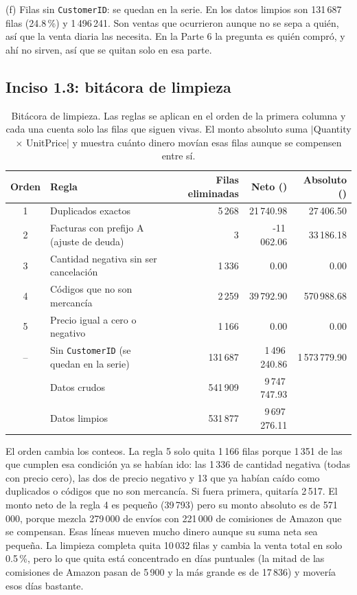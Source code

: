 \documentclass[11pt]{article}
\begin{document}
(f) Filas sin \texttt{CustomerID}: se quedan en la serie. En los datos limpios son
131\,687 filas (24.8\,\%) y \textsterling{}1\,496\,241. Son ventas que ocurrieron aunque no se sepa a quién,
así que la venta diaria las necesita. En la Parte 6 la pregunta es quién compró, y ahí no sirven,
así que se quitan solo en esa parte.

\subsection*{Inciso 1.3: bitácora de limpieza}

\begin{table}[H]
\centering
\caption{Bitácora de limpieza. Las reglas se aplican en el orden de la primera columna y cada
una cuenta solo las filas que siguen vivas. El monto absoluto suma $|$Quantity $\times$
UnitPrice$|$ y muestra cuánto dinero movían esas filas aunque se compensen entre sí.}\label{tab:bitacora}
\small
\begin{tabular}{|c|l|r|r|r|}
\hline
Orden & Regla & Filas eliminadas & Neto (\textsterling{}) & Absoluto (\textsterling{}) \\
\hline
1 & Duplicados exactos & 5\,268 & 21\,740.98 & 27\,406.50 \\
2 & Facturas con prefijo A (ajuste de deuda) & 3 & -11\,062.06 & 33\,186.18 \\
3 & Cantidad negativa sin ser cancelación & 1\,336 & 0.00 & 0.00 \\
4 & Códigos que no son mercancía & 2\,259 & 39\,792.90 & 570\,988.68 \\
5 & Precio igual a cero o negativo & 1\,166 & 0.00 & 0.00 \\
\hline
-- & Sin \texttt{CustomerID} (se quedan en la serie) & 131\,687 & 1\,496\,240.86 & 1\,573\,779.90 \\
\hline
& Datos crudos & 541\,909 & 9\,747\,747.93 & \\
& Datos limpios & 531\,877 & 9\,697\,276.11 & \\
\hline
\end{tabular}
\end{table}

El orden cambia los conteos. La regla 5 solo quita 1\,166 filas porque 1\,351 de las que
cumplen esa condición ya se habían ido: las 1\,336 de cantidad negativa (todas con precio cero),
las dos de precio negativo y 13 que ya habían caído como duplicados o códigos que no son
mercancía. Si fuera primera, quitaría 2\,517. El monto neto de la regla 4 es pequeño (\textsterling{}39\,793) pero su monto absoluto
es de \textsterling{}571\,000, porque mezcla \textsterling{}279\,000 de envíos con \textsterling{}221\,000 de comisiones de Amazon que se
compensan. Esas líneas mueven mucho dinero aunque su suma neta sea pequeña. La limpieza
completa quita 10\,032 filas y cambia la venta total en solo 0.5\,\%, pero lo que quita está
concentrado en días puntuales (la mitad de las comisiones de Amazon pasan de \textsterling{}5\,900 y la más
grande es de \textsterling{}17\,836) y movería esos días bastante.
\end{document}
